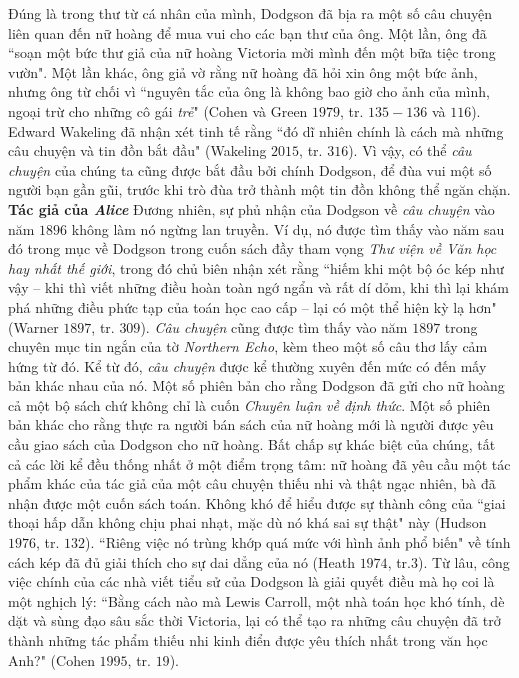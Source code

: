 \begin{multicols}{2}
	\vskip 0.1cm
	Đúng là trong thư từ cá nhân của mình, Dodgson đã bịa ra một số câu chuyện liên quan đến nữ hoàng để mua vui cho các bạn thư của ông. Một lần, ông đã ``soạn một bức thư giả của nữ hoàng Victoria mời mình đến một bữa tiệc trong vườn". Một lần khác, ông giả vờ rằng nữ hoàng đã hỏi xin ông một bức ảnh, nhưng ông từ chối vì ``nguyên tắc của ông là không bao giờ cho ảnh của mình, ngoại trừ cho những cô gái \textit{trẻ}" (Cohen và Green $1979$, tr. $135-136$ và $116$). Edward Wakeling đã nhận xét tinh tế rằng ``đó dĩ nhiên chính là cách mà những câu chuyện và tin đồn bắt đầu" (Wakeling $2015$, tr. $316$). Vì vậy, có thể \textit{câu chuyện} của chúng ta cũng được bắt đầu bởi chính Dodgson, để đùa vui một số người bạn gần gũi, trước khi trò đùa trở thành một tin đồn không thể ngăn chặn.
	\vskip 0.1cm
	\textbf{\color{quantoan}Tác giả của \textit{Alice}}
	\vskip 0.1cm
	Đương nhiên, sự phủ nhận của Dodgson về \textit{câu chuyện} vào năm $1896$ không làm nó ngừng lan truyền. Ví dụ, nó được tìm thấy vào năm sau đó trong mục về Dodgson trong cuốn sách đầy tham vọng \textit{Thư viện về Văn học hay nhất thế giới}, trong đó chủ biên nhận xét rằng 
	\vskip 0.1cm
	``hiếm khi một bộ óc kép như vậy -- khi thì viết những điều hoàn toàn ngớ ngẩn và rất dí dỏm, khi thì lại khám phá những điều phức tạp của toán học cao cấp -- lại có một thể hiện kỳ lạ hơn" (Warner $1897$, tr. $309$).
	\vskip 0.1cm
	\textit{Câu chuyện} cũng được tìm thấy vào năm $1897$ trong chuyên mục tin ngắn của tờ \textit{Northern Echo}, kèm theo một số câu thơ lấy cảm hứng từ đó.
	\vskip 0.1cm
	Kể từ đó, \textit{câu chuyện} được kể thường xuyên đến mức có đến mấy bản khác nhau của nó. Một số phiên bản cho rằng Dodgson đã gửi cho nữ hoàng cả một bộ sách chứ không chỉ là cuốn \textit{Chuyên luận về định thức}. Một số phiên bản khác cho rằng thực ra người bán sách của nữ hoàng mới là người được yêu cầu giao sách của Dodgson cho nữ hoàng. Bất chấp sự khác biệt của chúng, tất cả các lời kể đều thống nhất ở một điểm trọng tâm: nữ hoàng đã yêu cầu một tác phẩm khác của tác giả của một câu chuyện thiếu nhi và thật ngạc nhiên, bà đã nhận được một cuốn sách toán.
	\vskip 0.1cm
	Không khó để hiểu được sự thành công của ``giai thoại hấp dẫn không chịu phai nhạt, mặc dù nó khá sai sự thật" này (Hudson $1976$, tr. $132$). ``Riêng việc nó trùng khớp quá mức với hình ảnh phổ biến" về tính cách kép đã đủ giải thích cho sự dai dẳng của nó (Heath $1974$, tr.$3$). Từ lâu, công việc chính của các nhà viết tiểu sử của Dodgson là giải quyết điều mà họ coi là một nghịch lý: ``Bằng cách nào mà Lewis Carroll, một nhà toán học  khó tính, dè dặt và sùng đạo sâu sắc thời Victoria, lại có thể tạo ra những câu chuyện đã trở thành những tác phẩm thiếu nhi kinh điển được yêu thích nhất trong văn học Anh?" (Cohen $1995$, tr. $19$).

\end{multicols}
